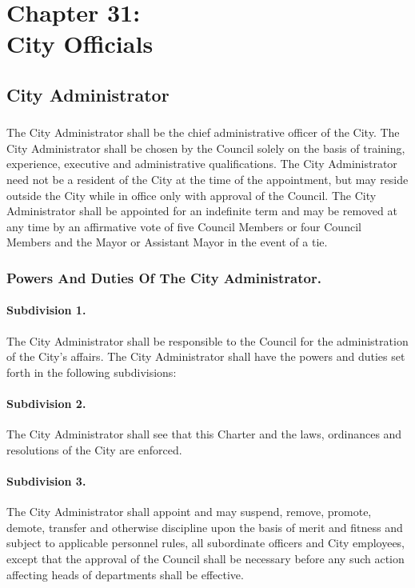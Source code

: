 \chapter*{Chapter 31: \\
	City Officials}
    \minitoc
    \pagebreak

\section{City Administrator}
\subsection{}
The City Administrator shall be the chief administrative officer of the City. The City Administrator shall be chosen by the Council solely on the basis of training, experience, executive and administrative qualifications. The City Administrator need not be a resident of the City at the time of the appointment, but may reside outside the City while in office only with approval of the Council. The City Administrator shall be appointed for an indefinite term and may be removed at any time by an affirmative vote of five Council Members or four Council Members and the Mayor or Assistant Mayor in the event of a tie.
\subsection{Powers And Duties Of The City Administrator.}
\subsubsection*{Subdivision 1.}
The City Administrator shall be responsible to the Council for the administration of the City’s affairs. The City Administrator shall have the powers and duties set forth in the following subdivisions:
\subsubsection*{Subdivision 2.}
The City Administrator shall see that this Charter and the laws, ordinances and resolutions of the City are enforced.
\subsubsection*{Subdivision 3.}
The City Administrator shall appoint and may suspend, remove, promote, demote, transfer and otherwise discipline upon the basis of merit and fitness and subject to applicable personnel rules, all subordinate officers and City employees, except that the approval of the Council shall be necessary before any such action affecting heads of departments shall be effective.
